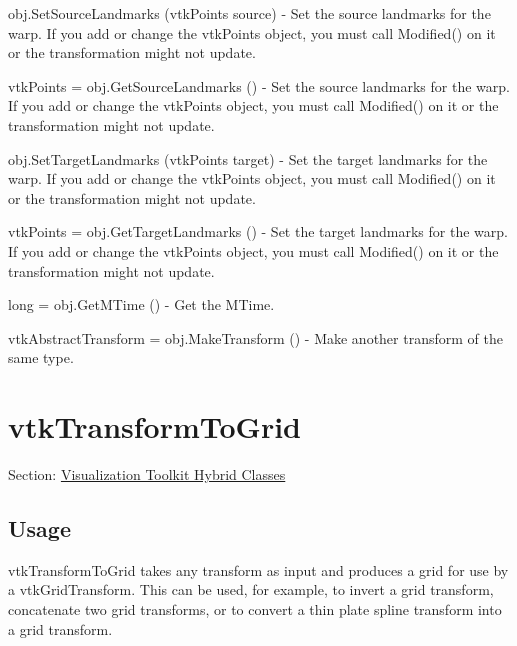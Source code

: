 \begin{DoxyItemize}
\item {\ttfamily obj.\-Set\-Source\-Landmarks (vtk\-Points source)} -\/ Set the source landmarks for the warp. If you add or change the vtk\-Points object, you must call Modified() on it or the transformation might not update.  
\item {\ttfamily vtk\-Points = obj.\-Get\-Source\-Landmarks ()} -\/ Set the source landmarks for the warp. If you add or change the vtk\-Points object, you must call Modified() on it or the transformation might not update.  
\item {\ttfamily obj.\-Set\-Target\-Landmarks (vtk\-Points target)} -\/ Set the target landmarks for the warp. If you add or change the vtk\-Points object, you must call Modified() on it or the transformation might not update.  
\item {\ttfamily vtk\-Points = obj.\-Get\-Target\-Landmarks ()} -\/ Set the target landmarks for the warp. If you add or change the vtk\-Points object, you must call Modified() on it or the transformation might not update.  
\item {\ttfamily long = obj.\-Get\-M\-Time ()} -\/ Get the M\-Time.  
\item {\ttfamily vtk\-Abstract\-Transform = obj.\-Make\-Transform ()} -\/ Make another transform of the same type.  
\end{DoxyItemize}\hypertarget{vtkhybrid_vtktransformtogrid}{}\section{vtk\-Transform\-To\-Grid}\label{vtkhybrid_vtktransformtogrid}
Section\-: \hyperlink{sec_vtkhybrid}{Visualization Toolkit Hybrid Classes} \hypertarget{vtkwidgets_vtkxyplotwidget_Usage}{}\subsection{Usage}\label{vtkwidgets_vtkxyplotwidget_Usage}
vtk\-Transform\-To\-Grid takes any transform as input and produces a grid for use by a vtk\-Grid\-Transform. This can be used, for example, to invert a grid transform, concatenate two grid transforms, or to convert a thin plate spline transform into a grid transform.

